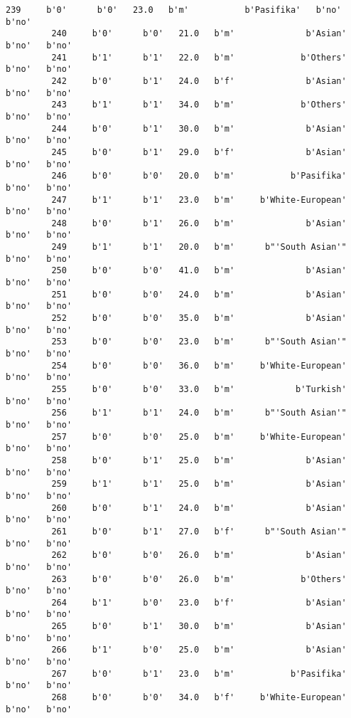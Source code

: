\documentclass[11pt]{article}
\begin{document}
\begin{Verbatim}[commandchars=\\\{\}]
         239     b'0'      b'0'   23.0   b'm'           b'Pasifika'   b'no'   b'no'   
         240     b'0'      b'0'   21.0   b'm'              b'Asian'   b'no'   b'no'   
         241     b'1'      b'1'   22.0   b'm'             b'Others'   b'no'   b'no'   
         242     b'0'      b'1'   24.0   b'f'              b'Asian'   b'no'   b'no'   
         243     b'1'      b'1'   34.0   b'm'             b'Others'   b'no'   b'no'   
         244     b'0'      b'1'   30.0   b'm'              b'Asian'   b'no'   b'no'   
         245     b'0'      b'1'   29.0   b'f'              b'Asian'   b'no'   b'no'   
         246     b'0'      b'0'   20.0   b'm'           b'Pasifika'   b'no'   b'no'   
         247     b'1'      b'1'   23.0   b'm'     b'White-European'   b'no'   b'no'   
         248     b'0'      b'1'   26.0   b'm'              b'Asian'   b'no'   b'no'   
         249     b'1'      b'1'   20.0   b'm'      b"'South Asian'"   b'no'   b'no'   
         250     b'0'      b'0'   41.0   b'm'              b'Asian'   b'no'   b'no'   
         251     b'0'      b'0'   24.0   b'm'              b'Asian'   b'no'   b'no'   
         252     b'0'      b'0'   35.0   b'm'              b'Asian'   b'no'   b'no'   
         253     b'0'      b'0'   23.0   b'm'      b"'South Asian'"   b'no'   b'no'   
         254     b'0'      b'0'   36.0   b'm'     b'White-European'   b'no'   b'no'   
         255     b'0'      b'0'   33.0   b'm'            b'Turkish'   b'no'   b'no'   
         256     b'1'      b'1'   24.0   b'm'      b"'South Asian'"   b'no'   b'no'   
         257     b'0'      b'0'   25.0   b'm'     b'White-European'   b'no'   b'no'   
         258     b'0'      b'1'   25.0   b'm'              b'Asian'   b'no'   b'no'   
         259     b'1'      b'1'   25.0   b'm'              b'Asian'   b'no'   b'no'   
         260     b'0'      b'1'   24.0   b'm'              b'Asian'   b'no'   b'no'   
         261     b'0'      b'1'   27.0   b'f'      b"'South Asian'"   b'no'   b'no'   
         262     b'0'      b'0'   26.0   b'm'              b'Asian'   b'no'   b'no'   
         263     b'0'      b'0'   26.0   b'm'             b'Others'   b'no'   b'no'   
         264     b'1'      b'0'   23.0   b'f'              b'Asian'   b'no'   b'no'   
         265     b'0'      b'1'   30.0   b'm'              b'Asian'   b'no'   b'no'   
         266     b'1'      b'0'   25.0   b'm'              b'Asian'   b'no'   b'no'   
         267     b'0'      b'1'   23.0   b'm'           b'Pasifika'   b'no'   b'no'   
         268     b'0'      b'0'   34.0   b'f'     b'White-European'   b'no'   b'no'   

\end{Verbatim}
\end{document}
